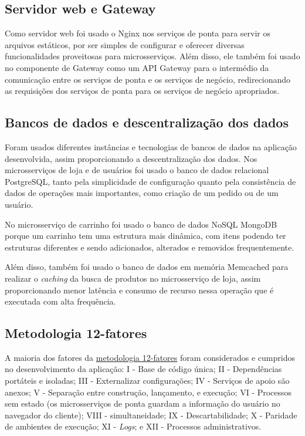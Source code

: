 \subsection*{Servidor web e Gateway}
Como servidor web foi usado o Nginx nos serviços de ponta para servir os arquivos estáticos, por ser simples de configurar e oferecer diversas funcionalidades proveitosas para microsserviços. Além disso, ele também foi usado no componente de Gateway como um API Gateway para o intermédio da comunicação entre os serviços de ponta e os serviços de negócio, redirecionando as requisições dos serviços de ponta para os serviços de negócio apropriados.

\subsection*{Bancos de dados e descentralização dos dados}
Foram usados diferentes instâncias e tecnologias de bancos de dados na aplicação desenvolvida, assim proporcionando a descentralização dos dados. Nos microsserviços de loja e de usuários foi usado o banco de dados relacional PostgreSQL, tanto pela simplicidade de configuração quanto pela consistência de dados de operações mais importantes, como criação de um pedido ou de um usuário.

No microsserviço de carrinho foi usado o banco de dados NoSQL MongoDB porque um carrinho tem uma estrutura mais dinâmica, com itens podendo ter estruturas diferentes e sendo adicionados, alterados e removidos frequentemente.

Além disso, também foi usado o banco de dados em memória Memcached para realizar o \emph{caching} da busca de produtos no microsserviço de loja, assim proporcionando menor latência e consumo de recurso nessa operação que é executada com alta frequência.

\subsection*{Metodologia 12-fatores}
A maioria dos fatores da \hyperref[metodologia-12-fatores]{metodologia 12-fatores} foram considerados e cumpridos no desenvolvimento da aplicação: I - Base de código única; II - Dependências portáteis e isoladas; III - Externalizar configurações; IV - Serviços de apoio são anexos; V - Separação entre construção, lançamento, e execução; VI - Processos sem estado (os microsserviços de ponta guardam a informação do usuário no navegador do cliente); VIII - simultaneidade; IX - Descartabilidade; X - Paridade de ambientes de execução; XI - \emph{Logs}; e XII - Processos administrativos.

